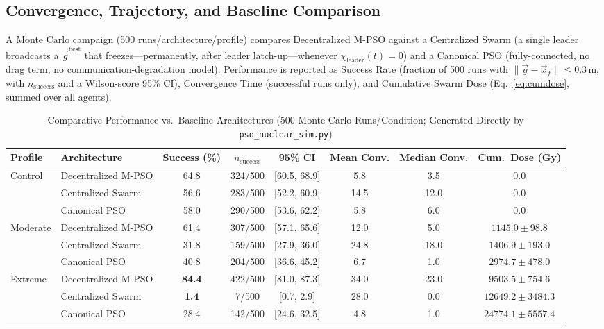 \documentclass[conference]{IEEEtran}
\begin{document}
\subsection{Convergence, Trajectory, and Baseline Comparison}
\label{sec:results}

A Monte Carlo campaign (500 runs/architecture/profile) compares Decentralized M-PSO against a Centralized Swarm (a single leader broadcasts a $\vec{g}^{\text{best}}$ that freezes---permanently, after leader latch-up---whenever $\chi_{\text{leader}}(t)=0$) and a Canonical PSO (fully-connected, no drag term, no communication-degradation model). Performance is reported as Success Rate (fraction of 500 runs with $\|\vec{g}-\vec{x}_f\|\le0.3\,\text{m}$, with $n_{\text{success}}$ and a Wilson-score 95\% CI), Convergence Time (successful runs only), and Cumulative Swarm Dose (Eq.~\ref{eq:cumdose}, summed over all agents).

\begin{table}[t]
\renewcommand{\arraystretch}{0.85}
\caption{Comparative Performance vs.\ Baseline Architectures (500 Monte Carlo Runs/Condition; Generated Directly by \texttt{pso\_nuclear\_sim.py})}
\label{tab:baseline-comparison}
\centering
\scriptsize
\setlength{\tabcolsep}{4pt}
\begin{tabular}{@{}l l c c c c c c@{}}
\toprule
\textbf{Profile} & \textbf{Architecture} & \textbf{Success (\%)} & \textbf{$n_{\text{success}}$} & \textbf{95\% CI} & \textbf{Mean Conv.} & \textbf{Median Conv.} & \textbf{Cum.\ Dose (Gy)} \\
\midrule
\multirow{3}{*}{Control}
 & Decentralized M-PSO & 64.8 & 324/500 & [60.5, 68.9] & 5.8  & 3.5  & $0.0$ \\
 & Centralized Swarm   & 56.6 & 283/500 & [52.2, 60.9] & 14.5 & 12.0 & $0.0$ \\
 & Canonical PSO       & 58.0 & 290/500 & [53.6, 62.2] & 5.8  & 6.0  & $0.0$ \\
\midrule
\multirow{3}{*}{Moderate}
 & Decentralized M-PSO & 61.4 & 307/500 & [57.1, 65.6] & 12.0 & 5.0  & $1145.0 \pm 98.8$ \\
 & Centralized Swarm   & 31.8 & 159/500 & [27.9, 36.0] & 24.8 & 18.0 & $1406.9 \pm 193.0$ \\
 & Canonical PSO       & 40.8 & 204/500 & [36.6, 45.2] & 6.7  & 1.0  & $2974.7 \pm 478.0$ \\
\midrule
\multirow{3}{*}{Extreme}
 & Decentralized M-PSO & \textbf{84.4} & 422/500 & [81.0, 87.3] & 34.0 & 23.0 & $9503.5 \pm 754.6$ \\
 & Centralized Swarm   & \textbf{1.4}  & 7/500   & [0.7, 2.9]   & 28.0 & 0.0  & $12649.2 \pm 3484.3$ \\
 & Canonical PSO       & 28.4 & 142/500 & [24.6, 32.5] & 4.8  & 1.0  & $24774.1 \pm 5557.4$ \\
\bottomrule
\end{tabular}
\end{table}
\end{document}
